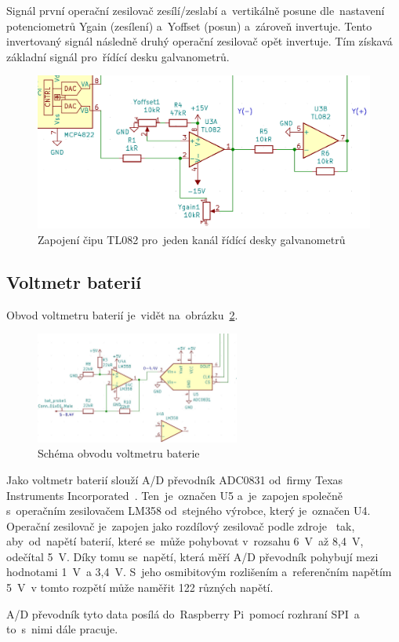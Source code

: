 Signál první operační zesilovač zesílí/zeslabí a~vertikálně posune dle~nastavení potenciometrů Ygain (zesílení) a~Yoffset (posun) a~zároveň invertuje. Tento invertovaný signál následně druhý operační zesilovač opět invertuje. Tím získavá základní signál pro~řídící desku galvanometrů.

\begin{figure}[htb]
  \centering
  \includegraphics[width=1\textwidth]{img/ilda_amps.png}
  \caption{\label{fig:ilda_amps-scheme} Zapojení čipu TL082 pro~jeden kanál řídící desky galvanometrů}
\end{figure}

\subsection{Voltmetr baterií}
Obvod voltmetru baterií je~vidět na~obrázku~\ref{fig:bat_probe}.

\begin{figure}[htb]
  \centering
  \includegraphics[width=0.6\textwidth]{img/bat_probe.jpg}
  \caption{\label{fig:bat_probe} Schéma obvodu voltmetru baterie}
\end{figure}

Jako voltmetr baterií slouží A/D převodník ADC0831 od~firmy Texas Instruments Incorporated~\cite{adc0831-dsh}. Ten~je~označen U5 a~je~zapojen společně s~operačním zesilovačem LM358 od~stejného výrobce, který je~označen U4.
Operační zesilovač je~zapojen jako rozdílový zesilovač podle zdroje~\cite{odcitacka} tak, aby~od~napětí baterií, které se~může pohybovat v~rozsahu 6~V~až 8,4~V, odečítal 5~V.
Díky tomu se~napětí, která měří A/D převodník pohybují mezi hodnotami 1~V~a 3,4~V. S~jeho osmibitovým rozlišením a~referenčním napětím 5~V~v tomto rozpětí může naměřit 122 různých napětí.

A/D převodník tyto data posílá do~Raspberry Pi~pomocí rozhraní SPI~a to~s~nimi dále pracuje.
